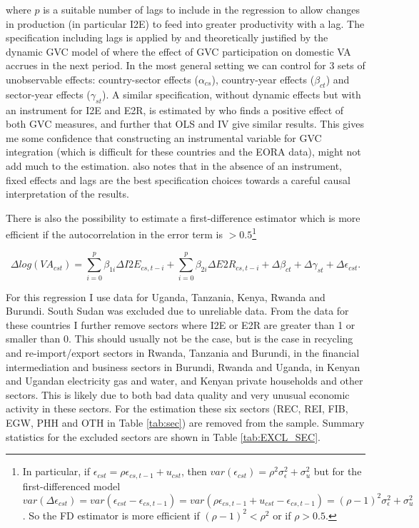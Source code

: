 \documentclass[a4paper]{article}
\begin{document}
where $p$ is a suitable number of lags to include in the regression to allow changes in production (in particular I2E) to feed into greater productivity with a lag. The specification including lags is applied by \citet{kummritz2015global} and theoretically justified by the dynamic GVC model of \citet{LiLiu2015moving} where the effect of GVC participation on domestic VA accrues in the next period. In the most general setting we can control for 3 sets of unobservable effects: country-sector effects ($\alpha_{cs}$), country-year effects ($\beta_{ct}$) and sector-year effects ($\gamma_{st}$). A similar specification, without dynamic effects but with an instrument for I2E and E2R, is estimated by \citet{Kummritz20161} who finds a positive effect of both GVC measures, and further that OLS and IV give similar results. This gives me some confidence that constructing an instrumental variable for GVC integration (which is difficult for these countries and the EORA data), might not add much to the estimation. \citet{kummritz2015global} also notes that in the absence of an instrument, fixed effects and lags are the best specification choices towards a careful causal interpretation of the results.  \newline

 There is also the possibility to estimate a first-difference estimator which is more efficient if the autocorrelation in the error term is $> 0.5$\footnote{In particular, if $\epsilon_{cst} = \rho \epsilon_{cs,t-1} + u_{cst}$, then $var(\epsilon_{cst}) = \rho^2 \sigma^2_\epsilon + \sigma^2_u$ but for the first-differenced model $var(\Delta \epsilon_{cst}) = var(\epsilon_{cst} - \epsilon_{cs,t-1}) = var(\rho \epsilon_{cs,t-1} + u_{cst} - \epsilon_{cs,t-1}) = (\rho-1)^2 \sigma^2_\epsilon + \sigma^2_u$. So the FD estimator is more efficient if $(\rho-1)^2<\rho^2$ or if $\rho > 0.5$. } 

\begin{equation} \label{eq:GROWTH_HDFE}
\Delta log(VA_{cst}) = \sum_{i=0}^p \beta_{1i} \Delta I2E_{cs,t-i} + \sum_{i = 0}^p \beta_{2i} \Delta E2R_{cs,t-i}  + \Delta\beta_{ct} + \Delta\gamma_{st} + \Delta\epsilon_{cst}.
\end{equation}

For this regression I use data for Uganda, Tanzania, Kenya, Rwanda and Burundi. South Sudan was excluded due to unreliable data. From the data for these countries I further remove sectors where I2E or E2R are greater than 1 or smaller than 0. This should usually not be the case, but is the case in recycling and re-import/export sectors in Rwanda, Tanzania and Burundi, in the financial intermediation and business sectors in Burundi, Rwanda and Uganda, in Kenyan and Ugandan electricity gas and water, and Kenyan private households and other sectors. This is likely due to both bad data quality and very unusual economic activity in these sectors. For the estimation these six sectors (REC, REI, FIB, EGW, PHH and OTH in Table \ref{tab:sec}) are removed from the sample. %
Summary statistics for the excluded sectors are shown in Table \ref{tab:EXCL_SEC}.
\end{document}
